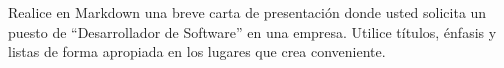 \begin{exercise}
Realice en Markdown una breve carta de presentación donde usted solicita
un puesto de ``Desarrollador de Software'' en una empresa. Utilice títulos,
énfasis y listas de forma apropiada en los lugares que crea conveniente.
\end{exercise}
